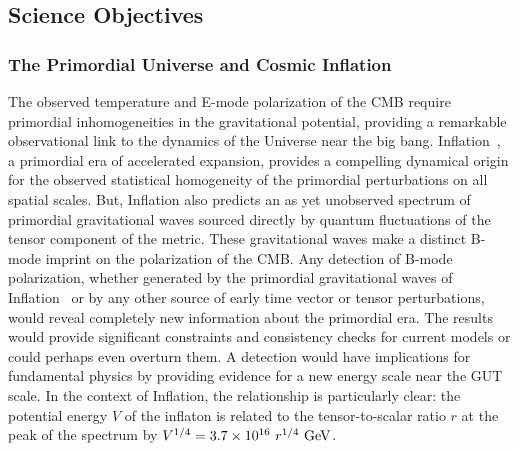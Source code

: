 
\subsection{Science Objectives}
\label{sec:science}

\vspace{-0.05in}
 
\subsubsection{The Primordial Universe and Cosmic Inflation}

\vspace{-0.05in}

The observed temperature and E-mode polarization of the \ac{CMB} require primordial inhomogeneities in the 
gravitational potential, providing a remarkable observational link to the dynamics of the Universe near the big bang.
Inflation~\cite{guth81,linde82,albrecht82,sato81,kolb94}, a primordial era of accelerated expansion, provides a compelling 
dynamical origin for the observed statistical homogeneity of the primordial perturbations on all spatial scales. 
But, Inflation also predicts an as yet unobserved spectrum of primordial gravitational waves sourced directly by 
quantum fluctuations of the tensor component of the metric. These gravitational waves make a distinct B-mode imprint on the polarization of the \ac{CMB}. 
Any detection of B-mode polarization, whether generated by the primordial gravitational waves of 
Inflation~\cite{kamionkowski97a,zaldarriaga97} or by any other source of early time vector or tensor perturbations, 
would reveal completely new information about the primordial era. The results would provide significant constraints 
and consistency checks for current models or could perhaps even overturn them. A detection would have 
implications for fundamental physics by providing evidence for a new energy scale near the GUT scale. 
In the context of Inflation, the relationship is particularly clear: the 
potential energy $V$ of the inflaton is related to the tensor-to-scalar ratio $r$ at the peak of the 
spectrum by $V^{1/4} = 3.7 \times 10^{16} \ r^{1/4}\,\, {\rm GeV}$. 

